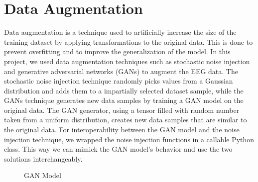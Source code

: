 \section{Data Augmentation}
Data augmentation is a technique used to artificially increase the size of the training dataset by applying transformations to the original data.
This is done to prevent overfitting and to improve the generalization of the model.
In this project, we used data augmentation techniques such as stochastic noise injection and generative adversarial networks (GANs) to augment the EEG data.
The stochastic noise injection technique randomly picks values from a Gaussian distribution and adds them to a impartially selected dataset sample, while the GANs technique generates new data samples by training a GAN model on the original data.
The GAN generator, using a tensor filled with random number taken from a uniform distribution, creates new data samples that are similar to the original data.
For interoperability between the GAN model and the noise injection technique, we wrapped the noise injection functions in a callable Python class.
This way we can mimick the GAN model's behavior and use the two solutions interchangeably.
\begin{figure}[!htbp]
    \centering
    \caption{GAN Model}
    \label{fig:gan}
\end{figure}

